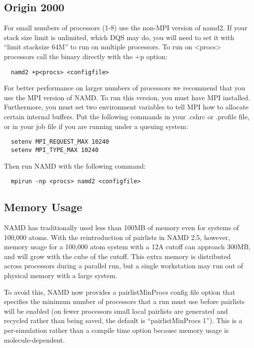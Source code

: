 \subsection{Origin 2000}

For small numbers of processors (1-8) use the non-MPI version of namd2.
If your stack size limit is unlimited, which DQS may do, you will need
to set it with ``limit stacksize 64M'' to run on multiple processors.
To run on <procs> processors call the binary directly with the +p option:

\begin{verbatim}
  namd2 +p<procs> <configfile>
\end{verbatim}

For better performance on larger numbers of processors we recommend
that you use the MPI version of NAMD.  To run this version, you must
have MPI installed.  Furthermore, you must set two environment
variables to tell MPI how to allocate certain internal buffers.  Put
the following commands in your .cshrc or .profile file, or in your
job file if you are running under a queuing system:

\begin{verbatim}
  setenv MPI_REQUEST_MAX 10240
  setenv MPI_TYPE_MAX 10240
\end{verbatim}

Then run NAMD with the following command:

\begin{verbatim}
  mpirun -np <procs> namd2 <configfile>
\end{verbatim}

\subsection{Memory Usage}

NAMD has traditionally used less than 100MB of memory even for systems
of 100,000 atoms.  With the reintroduction of pairlists in NAMD 2.5,
however, memory usage for a 100,000 atom system with a 12A cutoff can
approach 300MB, and will grow with the cube of the cutoff.  This extra
memory is distributed across processors during a parallel run, but a
single workstation may run out of physical memory with a large system.

To avoid this, NAMD now provides a pairlistMinProcs config file option
that specifies the minimum number of processors that a run must use
before pairlists will be enabled (on fewer processors small local
pairlists are generated and recycled rather than being saved, the
default is ``pairlistMinProcs 1'').  This is a per-simulation rather than
a compile time option because memory usage is molecule-dependent.

